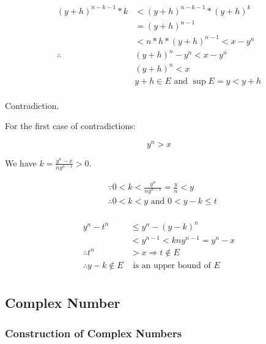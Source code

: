 \documentclass{article}
\begin{document}
    \begin{align*}
        (y + h)^{n - k - 1} * k &< (y + h)^{n - k - 1} * (y + h)^{k} \\
                                        &= (y + h)^{n - 1} \\
                                        &< n * h * (y + h)^{n - 1} < x - y^{n} \\
                                        \therefore &(y + h)^{n} - y^{n} < x - y^{n} \\
                                                        &(y + h)^{n} < x \\
                                                        &y + h \in E \text{ and } \sup E = y < y + h \\
    \end{align*}
    
    Contradiction.
    
    For the first case of contradictions:
    
    \begin{displaymath}
        y^{n} > x
    \end{displaymath}
    
    We have $k = \frac{y^{n} - x}{ny^{n - 1}} > 0$.
    
    \begin{align*}
        &\because 0 < k < \frac{y^{n}}{ny^{n - 1}} = \frac{y}{n} < y \\
        &\therefore 0 < k < y \text{ and } 0 < y - k \leq t \\
    \end{align*}
    
    \begin{align*}
        y^{n} - t^{n} &\leq y^{n} - (y - k)^{n} \\
                           &< y^{n - 1} < kny^{n - 1} = y^{n} - x \\
        \therefore t^{n} &> x \Rightarrow t \notin E \\
        \therefore y - k \notin E &\text{ is an upper bound of } E \\
    \end{align*}
    
    \subsection{Complex Number}
    
    \subsubsection{Construction of Complex Numbers}
    
\end{document}
